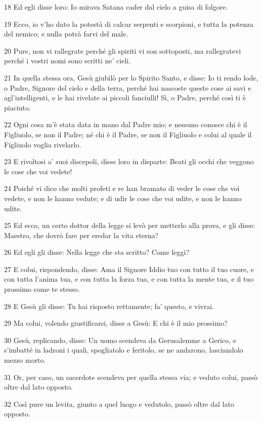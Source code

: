 \par 18 Ed egli disse loro: Io mirava Satana cader dal cielo a guisa di folgore.
\par 19 Ecco, io v'ho dato la potestà di calcar serpenti e scorpioni, e tutta la potenza del nemico; e nulla potrà farvi del male.
\par 20 Pure, non vi rallegrate perché gli spiriti vi son sottoposti, ma rallegratevi perché i vostri nomi sono scritti ne' cieli.
\par 21 In quella stessa ora, Gesù giubilò per lo Spirito Santo, e disse: Io ti rendo lode, o Padre, Signore del cielo e della terra, perché hai nascoste queste cose ai savi e agl'intelligenti, e le hai rivelate ai piccoli fanciulli! Sì, o Padre, perché così ti è piaciuto.
\par 22 Ogni cosa m'è stata data in mano dal Padre mio; e nessuno conosce chi è il Figliuolo, se non il Padre; né chi è il Padre, se non il Figliuolo e colui al quale il Figliuolo voglia rivelarlo.
\par 23 E rivoltosi a' suoi discepoli, disse loro in disparte: Beati gli occhi che veggono le cose che voi vedete!
\par 24 Poiché vi dico che molti profeti e re han bramato di veder le cose che voi vedete, e non le hanno vedute; e di udir le cose che voi udite, e non le hanno udite.
\par 25 Ed ecco, un certo dottor della legge si levò per metterlo alla prova, e gli disse: Maestro, che dovrò fare per eredar la vita eterna?
\par 26 Ed egli gli disse: Nella legge che sta scritto? Come leggi?
\par 27 E colui, rispondendo, disse: Ama il Signore Iddio tuo con tutto il tuo cuore, e con tutta l'anima tua, e con tutta la forza tua, e con tutta la mente tua, e il tuo prossimo come te stesso.
\par 28 E Gesù gli disse: Tu hai risposto rettamente; fa' questo, e vivrai.
\par 29 Ma colui, volendo giustificarsi, disse a Gesù: E chi è il mio prossimo?
\par 30 Gesù, replicando, disse: Un uomo scendeva da Gerusalemme a Gerico, e s'imbatté in ladroni i quali, spogliatolo e feritolo, se ne andarono, lasciandolo mezzo morto.
\par 31 Or, per caso, un sacerdote scendeva per quella stessa via; e veduto colui, passò oltre dal lato opposto.
\par 32 Così pure un levita, giunto a quel luogo e vedutolo, passò oltre dal lato opposto.
